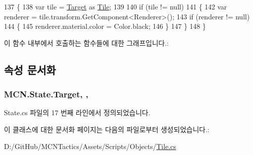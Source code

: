 \begin{DoxyCode}
137         \{
138             var tile = \hyperlink{class_m_c_n_1_1_state_a79a563b32f183c9adc9a96679fc57eb8}{Target} as \hyperlink{class_tile_a7684d2e86beeb06d844ebb7819b11b33}{Tile};
139 
140             \textcolor{keywordflow}{if} (tile != null)
141             \{
142                 var renderer = tile.transform.GetComponent<Renderer>();
143                 \textcolor{keywordflow}{if} (renderer != null)
144                 \{
145                     renderer.material.color = Color.black;
146                 \}
147             \}
148         \}
\end{DoxyCode}


이 함수 내부에서 호출하는 함수들에 대한 그래프입니다.\+:




\subsection{속성 문서화}
\subsubsection[{\texorpdfstring{Target}{Target}}]{ M\+C\+N.\+State.\+Target\hspace{0.3cm}{\ttfamily [get]}, {\ttfamily [protected]}, {\ttfamily [inherited]}}\hypertarget{class_m_c_n_1_1_state_a79a563b32f183c9adc9a96679fc57eb8}{}\label{class_m_c_n_1_1_state_a79a563b32f183c9adc9a96679fc57eb8}


State.\+cs 파일의 17 번째 라인에서 정의되었습니다.



이 클래스에 대한 문서화 페이지는 다음의 파일로부터 생성되었습니다.\+:\begin{DoxyCompactItemize}
\item 
D\+:/\+Git\+Hub/\+M\+C\+N\+Tactics/\+Assets/\+Scripts/\+Objects/\hyperlink{_tile_8cs}{Tile.\+cs}\end{DoxyCompactItemize}
